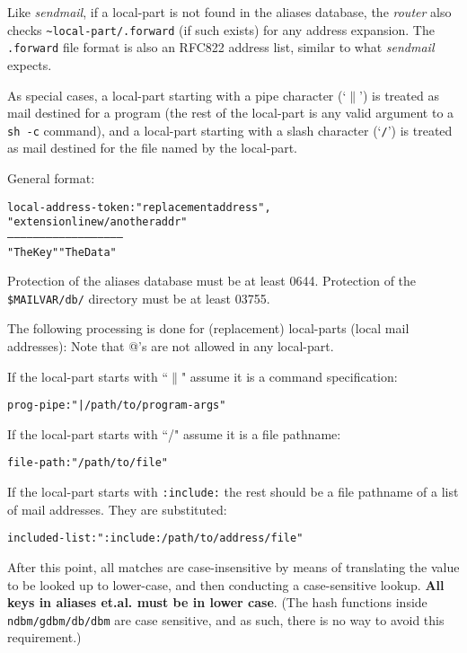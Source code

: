 Like {\em sendmail}, if a local-part is not found in the aliases database, the
{\em router} also checks {\tt \~{}local-part/.forward} (if such exists) for 
any address expansion.  The {\tt .forward} file format is also an RFC822 
address list, similar to what {\em sendmail} expects.

As special cases, a local-part starting with a pipe character (`{\tt $\|$}') is
treated as mail destined for a program (the rest of the local-part is any
valid argument to a {\tt sh -c} command), and a local-part starting with a
slash character (`{\tt /}') is treated as mail destined for the file named 
by the local-part.

General format:

\begin{alltt}
 local-address-token:    "replacement address" ,
                         "extension line w/ another addr"
 --------------------    --------------------------------
     "The Key"                "The Data"
\end{alltt}

Protection of the aliases database must be at least 0644.
Protection of the {\tt \$MAILVAR/db/} directory must be at least 03755.



The following processing is done for (replacement) local-parts
(local mail addresses):  Note that @'s are not allowed in any local-part.



If the local-part starts with ``{\tt $\|$}" assume it is a command specification:
\begin{alltt}
    prog-pipe: "|/path/to/program -args"
\end{alltt}

If the local-part starts with ``/" assume it is a file pathname:
\begin{alltt}
    file-path: "/path/to/file"
\end{alltt}

If the local-part starts with {\tt :include:} the rest should be a file
pathname of a list of mail addresses.  They are substituted:
\begin{alltt}
    included-list: ":include:/path/to/address/file"
\end{alltt}

After this point, all matches are case-insensitive by means of translating
the value to be looked up to lower-case, and then conducting a case-sensitive
lookup. {\bf All keys in aliases et.al. must be in lower case}.
(The hash functions inside  {\tt ndbm/gdbm/db/dbm}  are case sensitive, and 
as such, there is no way to avoid this requirement.)



